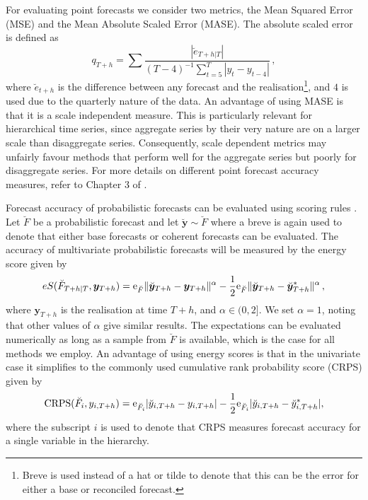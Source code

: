 \documentclass[graybox]{svmult}
\begin{document}
For evaluating point forecasts we consider two metrics, the Mean Squared Error (MSE) and the Mean Absolute Scaled Error (MASE). The absolute scaled error is defined as
\begin{equation*}
	q_{T+h} = \sum \frac{|\breve{e}_{T+h|T}|}{(T-4)^{-1}\sum_{t=5}^{T}|y_t - y_{t-4}|}\,,
\end{equation*}
where $\breve{e}_{t+h}$ is the difference between any forecast and the realisation\footnote{Breve is used instead of a hat or tilde to denote that this can be the error for either a base or reconciled forecast.}, and $4$ is used due to the quarterly nature of the data. An advantage of using MASE is that it is a scale independent measure. This is particularly relevant for hierarchical time series, since aggregate series by their very nature are on a larger scale than disaggregate series. Consequently, scale dependent metrics may unfairly favour methods that perform well for the aggregate series but poorly for disaggregate series. For more details on different point forecast accuracy measures, refer to Chapter 3 of \citet{HynAth2018}.

Forecast accuracy of probabilistic forecasts can be evaluated using scoring rules \citep{Gneiting2014}. Let $\breve{F}$ be a probabilistic forecast and let $\breve{\bm{y}}\sim \breve{F}$ where a breve is again used to denote that either base forecasts or coherent forecasts can be evaluated. The accuracy of multivariate probabilistic forecasts will be measured by the energy score given by
\begin{equation*}
	eS(\breve{F}_{T+h|T},\bm{y}_{T+h}) =
	\mathrm{e}_{\breve{F}}\|\breve{\bm{y}}_{T+h}-\bm{y}_{T+h}\|^\alpha
	-\frac{1}{2}\mathrm{e}_{\breve{F}}\|\breve{\bm{y}}_{T+h}-\breve{\bm{y}}^*_{T+h}\|^\alpha\,,
\end{equation*} where $\bm{y}_{T+h}$ is the realisation at time $T+h$, and $\alpha\in (0,2]$. We set $\alpha=1$, noting that other values of $\alpha$ give similar results. The expectations can be evaluated numerically as long as a sample from $\breve{F}$ is available, which is the case for all methods we employ. An advantage of using energy scores is that in the univariate case it simplifies to the commonly used cumulative rank probability score (CRPS) given by
\begin{equation*}
	\text{CRPS}(\breve{F}_i,y_{i,T+h}) = \mathrm{e}_{\breve{F}_i}|\breve{y}_{i,T+h}-y_{i,T+h}| - \frac{1}{2}\mathrm{e}_{\breve{F}_i}|\breve{y}_{i,T+h}-\breve{y}^*_{i,T+h}|,
\end{equation*}
where the subscript $i$ is used to denote that CRPS measures forecast accuracy for a single variable in the hierarchy.
\end{document}
